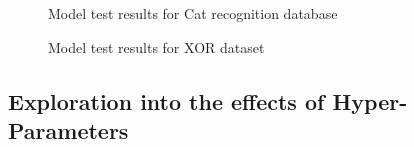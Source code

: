 \documentclass[./project-report/src/latex/project-report.tex]{subfiles}
\begin{document}
\pagebreak

\begin{figure}[h!]
\centering
{}
\caption{Model test results for Cat recognition database}
\end{figure}

\pagebreak

\begin{figure}[h!]
\centering
{}
\caption{Model test results for XOR dataset}
\label{fig:xor-test_frame-impl}
\end{figure}

\subsection{Exploration into the effects of Hyper-Parameters}
\label{sec:effects-of-hyper-parameters}
\end{document}
